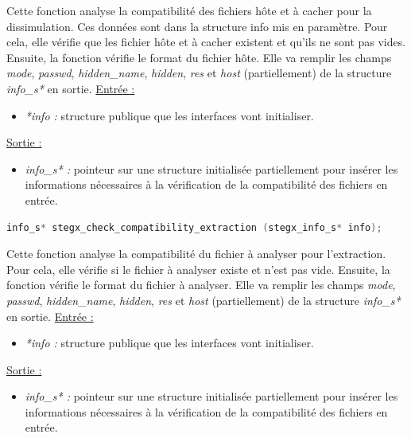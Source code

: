 \documentclass[11pt]{article}
\begin{document}
Cette fonction analyse la compatibilité des fichiers hôte et à cacher pour
la dissimulation. Ces données sont dans la structure info mis en paramètre. 
Pour cela, elle vérifie que les fichier hôte et à cacher existent et qu'ils 
ne sont pas vides. Ensuite, la fonction vérifie le format du fichier hôte. 
Elle va remplir les champs \textit{mode}, \textit{passwd}, \textit{hidden\_name}, \textit{hidden},
\textit{res} et \textit{host} (partiellement) de la structure
\textit{info\_s*} en sortie. 
\newline
\underline{Entrée :}
\begin{itemize}
\item \textit{*info :} structure publique que les interfaces vont initialiser.
\end{itemize}
\underline{Sortie :}
\begin{itemize}
\item \textit{info\_s* :} pointeur sur une structure initialisée 
partiellement pour insérer les informations nécessaires à la vérification 
de la compatibilité des fichiers en entrée. 
\newline 
\end{itemize}

\begin{lstlisting}[language=c]
info_s* stegx_check_compatibility_extraction (stegx_info_s* info);
\end{lstlisting}

Cette fonction analyse la compatibilité du fichier à analyser pour l'extraction. 
Pour cela, elle vérifie si le fichier à analyser existe et n'est pas vide. 
Ensuite, la fonction vérifie le format du fichier à analyser. 
Elle va remplir les champs \textit{mode}, \textit{passwd}, \textit{hidden\_name}, \textit{hidden},
\textit{res} et \textit{host} (partiellement) de la structure
\textit{info\_s*} en sortie. 
\newline
\underline{Entrée :}
\begin{itemize}
\item \textit{*info :} structure publique que les interfaces vont initialiser.
\end{itemize}
\underline{Sortie :}
\begin{itemize}
\item \textit{info\_s* :} pointeur sur une structure initialisée 
partiellement pour insérer les informations nécessaires à la vérification 
de la compatibilité des fichiers en entrée. 
\newline 
\end{itemize}
\end{document}
